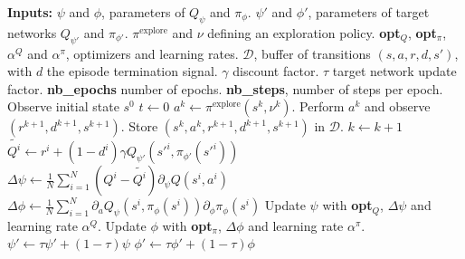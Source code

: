 
\begin{algorithmic}
	\STATE \textbf{Inputs:}
	\STATE $\psi$ and $\phi$, parameters of
	$Q_\psi$ and $\pi_\phi$.
	\STATE $\psi'$ and $\phi'$, parameters of target networks
	$Q_{\psi'}$ and $\pi_{\phi'}$.
	\STATE $\pi^{\text{explore}}$ and $\nu$ defining an exploration policy.
	\STATE \textbf{opt}$_Q$, \textbf{opt}$_\pi$, $\alpha^Q$ and $\alpha^\pi$, optimizers and learning rates.
	\STATE $\mathcal{D}$, buffer of transitions $(s, a, r, d, s')$, with $d$ the episode termination signal.
	\STATE $\gamma$ discount factor.
	\STATE $\tau$ target network update factor.
	\STATE \textbf{nb\_epochs} number of epochs.
	\STATE \textbf{nb\_steps}, number of steps per epoch.
	\STATE
	\STATE Observe initial state $s^0$
	\STATE $t \gets 0$
	\STATE $a^k \leftarrow \pi^{\text{explore}}(s^k, \nu^k)$.
	\STATE Perform $a^k$ and observe $(r^{k+1}, d^{k+1}, s^{k+1})$.
	\STATE Store $(s^k, a^k, r^{k+1}, d^{k+1}, s^{k+1})$ in $\mathcal{D}$.
	\STATE $k \gets k + 1$
	\ENDFOR
	\STATE {}
	\STATE $\tilde{Q^i} \gets r^i + (1 - d^i) \gamma Q_{\psi'}(s'^i, \pi_{\phi'}(s'^i))$
	\STATE $\Delta \psi \gets \frac{1}{N}\sum\limits_{i=1}^N \left(Q^i - \tilde{Q^i}\right) \partial_\psi Q(s^i, a^i)$
	\STATE $\Delta \phi \gets \frac{1}{N} \sum\limits_{i=1}^N \partial_a Q_\psi(s^i, \pi_\phi(s^i)) \partial_\phi \pi_\phi(s^i)$
	\STATE Update $\psi$ with \textbf{opt}$_Q$, $\Delta \psi$ and learning rate $\alpha^Q$.
	\STATE Update $\phi$ with \textbf{opt}$_\pi$, $\Delta \phi$ and learning rate $\alpha^\pi$.
	\STATE $\psi' \gets \tau \psi' + (1 - \tau) \psi$
	\STATE $\phi' \gets \tau \phi' + (1 - \tau) \phi$
	\ENDFOR
	\ENDFOR
\end{algorithmic}
